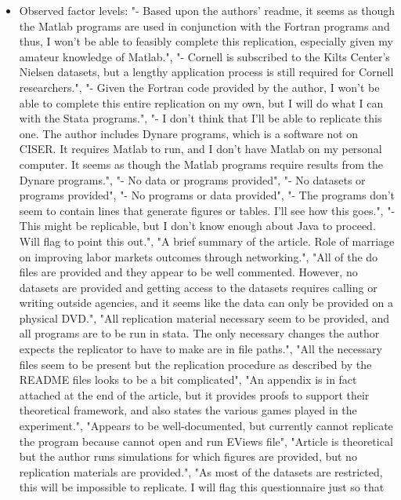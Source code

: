 \documentclass[]{article}
\providecommand{\tightlist}{%
  \setlength{\itemsep}{0pt}\setlength{\parskip}{0pt}}
\begin{document}
\begin{itemize}
\tightlist
\item
  Observed factor levels: "- Based upon the authors' readme, it seems as
  though the Matlab programs are used in conjunction with the Fortran
  programs and thus, I won't be able to feasibly complete this
  replication, especially given my amateur knowledge of Matlab.", "-
  Cornell is subscribed to the Kilts Center's Nielsen datasets, but a
  lengthy application process is still required for Cornell
  researchers.", "- Given the Fortran code provided by the author, I
  won't be able to complete this entire replication on my own, but I
  will do what I can with the Stata programs.", "- I don't think that
  I'll be able to replicate this one. The author includes Dynare
  programs, which is a software not on CISER. It requires Matlab to run,
  and I don't have Matlab on my personal computer. It seems as though
  the Matlab programs require results from the Dynare programs.", "- No
  data or programs provided", "- No datasets or programs provided", "-
  No programs or data provided", "- The programs don't seem to contain
  lines that generate figures or tables. I'll see how this goes.", "-
  This might be replicable, but I don't know enough about Java to
  proceed. Will flag to point this out.", "A brief summary of the
  article. Role of marriage on improving labor markets outcomes through
  networking.", "All of the do files are provided and they appear to be
  well commented. However, no datasets are provided and getting access
  to the datasets requires calling or writing outside agencies, and it
  seems like the data can only be provided on a physical DVD.", "All
  replication material necessary seem to be provided, and all programs
  are to be run in stata. The only necessary changes the author expects
  the replicator to have to make are in file paths.", "All the necessary
  files seem to be present but the replication procedure as described by
  the README files looks to be a bit complicated", "An appendix is in
  fact attached at the end of the article, but it provides proofs to
  support their theoretical framework, and also states the various games
  played in the experiment.", "Appears to be well-documented, but
  currently cannot replicate the program because cannot open and run
  EViews file", "Article is theoretical but the author runs simulations
  for which figures are provided, but no replication materials are
  provided.", "As most of the datasets are restricted, this will be
  impossible to replicate. I will flag this questionnaire just so that

\end{itemize}
\end{document}
